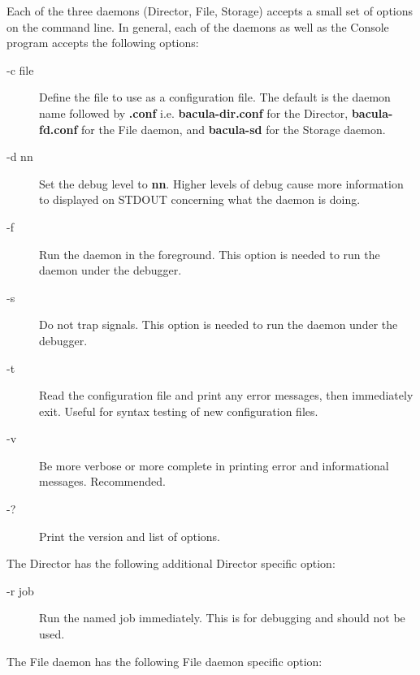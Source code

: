 {{Each of the three daemons (Director, File, Storage) accepts a small set of
options on the command line. In general, each of the daemons as well as the
Console program accepts the following options: 

\begin{description}

\item [-c \lt{}file\gt{}]
   Define the file to use as a  configuration file. The default is the daemon
name followed  by {\bf .conf} i.e. {\bf bacula-dir.conf} for the Director, 
{\bf bacula-fd.conf} for the File daemon, and {\bf bacula-sd}  for the Storage
daemon.  

\item [-d nn]
   Set the debug level to {\bf nn}. Higher levels  of debug cause more
information to displayed on STDOUT concerning  what the daemon is doing.  

\item [-f]
   Run the daemon in the foreground. This option is  needed to run the daemon
   under the debugger.  

\item [-s]
   Do not trap signals. This option is needed to run  the daemon under the
   debugger.  

\item [-t]
   Read the configuration file and print any error messages,  then immediately
   exit. Useful for syntax testing of  new configuration files.  

\item [-v]
   Be more verbose or more complete in printing error  and informational
   messages. Recommended.  

\item [-?]
   Print the version and list of options. 
   \end{description}

The Director has the following additional Director specific option: 

\begin{description}

\item [-r \lt{}job\gt{}]
   Run the named job immediately. This is  for debugging and should not be used. 
\end{description}

The File daemon has the following File daemon specific option: 

\begin{description}


\end{description}}}

